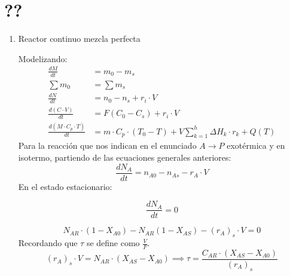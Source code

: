 \section{??}
\solve{}
\begin{enumerate}[label={\alph*)}]
	\item Reactor continuo mezcla perfecta

	      \noindent Modelizando:
	      \begin{align*}
		      \frac{dM}{dt}                     & = m_0 - m_s                                                                  \\[6pt]
		      \sum m_0                          & = \sum m_s                                                                   \\[6pt]
		      \frac{dN}{dt}                     & = n_0 - n_s + r_i \cdot V                                                    \\[6pt]
		      \frac{d(C \cdot V)}{dt}           & = F(C_0 - C_s) + r_i \cdot V                                                 \\[6pt]
		      \frac{d(M \cdot C_p \cdot T)}{dt} & = m \cdot C_p \cdot (T_0 - T) + V \sum_{k=1}^{h} \Delta H_k \cdot r_k + Q(T)
	      \end{align*}
	      \noindent Para la reacción que nos indican en el enunciado $A \rightarrow P$ exotérmica y en isotermo, partiendo de las ecuaciones generales anteriores:
	      \begin{equation*}
		      \frac{dN_A}{dt} = n_{A0} - n_{As} - r_A \cdot V
	      \end{equation*}
	      \noindent En el estado estacionario:

	      \begin{equation*}
		      \frac{dN_A}{dt} = 0
	      \end{equation*}

	      \begin{equation*}
		      N_{AR}\cdot (1-X_{A0}) - N_{AR}(1-X_{AS}) - (r_A)_s \cdot V = 0
	      \end{equation*}
	      \vspace{1.5em}
	      \noindent Recordando que $\tau$ se define como $\frac{V}{F}$.
	      \begin{equation*}
		      (r_A)_s \cdot V = N_{AR}\cdot (X_{AS}-X_{A0}) \implies \tau = \frac{C_{AR}\cdot (X_{AS}- X_{A0})}{(r_A)_s}
	      \end{equation*}


\end{enumerate}
